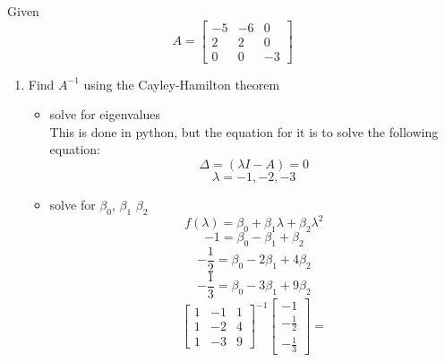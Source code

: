 \item Given
  \begin{equation}
    A = \begin{bmatrix}
-5 & -6 & 0\\
2 & 2 & 0\\
0 & 0 & -3
\end{bmatrix}
\end{equation}
  \begin{enumerate}
  \item Find $A^{-1}$ using the Cayley-Hamilton theorem \\
    \begin{itemize}
    \item solve for eigenvalues \\
      This is done in python, but the equation for it is to solve the following equation:
      \begin{equation}
        \Delta = (\lambda I - A) = 0
      \end{equation}
      \begin{equation}
        \lambda = -1, -2, -3
      \end{equation}
    \item solve for $\beta_0$, $\beta_1$ $\beta_2$\\
      \begin{equation}
        f(\lambda) = \beta_0 + \beta_1\lambda + \beta_2\lambda^2
      \end{equation}
      \begin{equation}
        -1 = \beta_0 - \beta_1 + \beta_2
      \end{equation}
      \begin{equation}
        -\frac 1 2 = \beta_0 - 2\beta_1 + 4\beta_2
      \end{equation}
      \begin{equation}
        -\frac 1 3 = \beta_0 - 3\beta_1 + 9\beta_2
      \end{equation}
      \begin{equation}
        \begin{bmatrix}
          1 & -1 & 1 \\
          1 & -2 & 4 \\
          1 & -3 & 9
        \end{bmatrix}^{-1}
        \begin{bmatrix}
          -1 \\
          -\frac 1 2 \\
          -\frac 1 3
        \end{bmatrix} =

\end{equation}
\end{itemize}
\end{enumerate}
